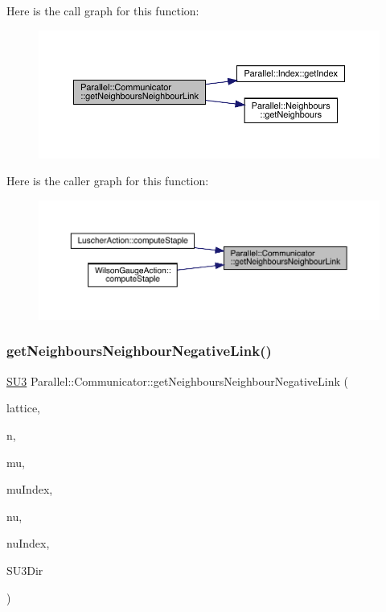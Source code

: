 Here is the call graph for this function\+:\nopagebreak
\begin{figure}[H]
\begin{center}
\leavevmode
\includegraphics[width=350pt]{class_parallel_1_1_communicator_a453ebde0502ed86b8bd95dede6f8e69c_cgraph}
\end{center}
\end{figure}
Here is the caller graph for this function\+:\nopagebreak
\begin{figure}[H]
\begin{center}
\leavevmode
\includegraphics[width=350pt]{class_parallel_1_1_communicator_a453ebde0502ed86b8bd95dede6f8e69c_icgraph}
\end{center}
\end{figure}
\mbox{\label{class_parallel_1_1_communicator_aebe919d44a02b37c98161ff4d3d23f6f}} 
\subsubsection{\texorpdfstring{getNeighboursNeighbourNegativeLink()}{getNeighboursNeighbourNegativeLink()}}
{\footnotesize\ttfamily \mbox{\hyperlink{class_s_u3}{S\+U3}} Parallel\+::\+Communicator\+::get\+Neighbours\+Neighbour\+Negative\+Link (\begin{DoxyParamCaption}\item[{\mbox{\hyperlink{class_lattice}{Lattice}}$<$ \mbox{\hyperlink{class_s_u3}{S\+U3}} $>$ $\ast$}]{lattice,  }\item[{std\+::vector$<$ int $>$}]{n,  }\item[{int}]{mu,  }\item[{int $\ast$}]{mu\+Index,  }\item[{int}]{nu,  }\item[{int $\ast$}]{nu\+Index,  }\item[{int}]{S\+U3\+Dir }\end{DoxyParamCaption})\hspace{0.3cm}{\ttfamily [static]}}

